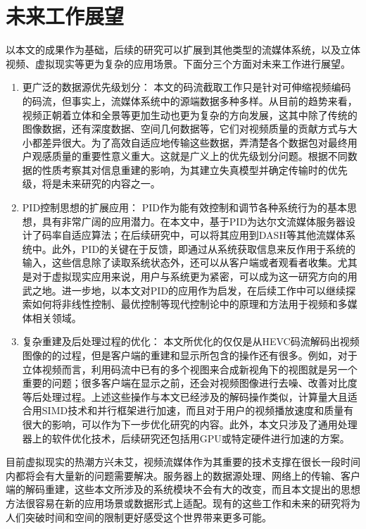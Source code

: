 \section{未来工作展望}

以本文的成果作为基础，后续的研究可以扩展到其他类型的流媒体系统，以及立体视频、虚拟现实等更为复杂的应用场景。下面分三个方面对未来工作进行展望。
\begin{enumerate}
\item {更广泛的数据源优先级划分：}
本文的码流截取工作只是针对可伸缩视频编码的码流，但事实上，流媒体系统中的源端数据多种多样。从目前的趋势来看，视频正朝着立体和全景等更加生动也更为复杂的方向发展，这其中除了传统的图像数据，还有深度数据、空间几何数据等，它们对视频质量的贡献方式与大小都差异很大。为了高效自适应地传输这些数据，弄清楚各个数据包对最终用户观感质量的重要性意义重大。这就是广义上的优先级划分问题。根据不同数据的性质考察其对信息重建的影响，为其建立失真模型并确定传输时的优先级，将是未来研究的内容之一。
\item {PID控制思想的扩展应用：}
PID作为能有效控制和调节各种系统行为的基本思想，具有非常广阔的应用潜力。在本文中，基于PID为达尔文流媒体服务器设计了码率自适应算法；在后续研究中，可以将其应用到DASH等其他流媒体系统中。此外，PID的关键在于反馈，即通过从系统获取信息来反作用于系统的输入，这些信息除了读取系统状态外，还可以从客户端或者观看者收集。尤其是对于虚拟现实应用来说，用户与系统更为紧密，可以成为这一研究方向的用武之地。进一步地，以本文对PID的应用作为启发，在后续工作中可以继续探索如何将非线性控制、最优控制等现代控制论中的原理和方法用于视频和多媒体相关领域。
\item {复杂重建及后处理过程的优化：}
本文所优化的仅仅是从HEVC码流解码出视频图像的的过程，但是客户端的重建和显示所包含的操作还有很多。例如，对于立体视频而言，利用码流中已有的多个视图来合成新视角下的视图就是另一个重要的问题；很多客户端在显示之前，还会对视频图像进行去噪、改善对比度等后处理过程。上述这些操作与本文已经涉及的解码操作类似，计算量大且适合用SIMD技术和并行框架进行加速，而且对于用户的视频播放速度和质量有很大的影响，可以作为下一步优化研究的内容。此外，本文只涉及了通用处理器上的软件优化技术，后续研究还包括用GPU或特定硬件进行加速的方案。
\end{enumerate}

目前虚拟现实的热潮方兴未艾，视频流媒体作为其重要的技术支撑在很长一段时间内都将会有大量新的问题需要解决。服务器上的数据源处理、网络上的传输、客户端的解码重建，这些本文所涉及的系统模块不会有大的改变，而且本文提出的思想方法很容易在新的应用场景或数据形式上适配。现有的这些工作和未来的研究将为人们突破时间和空间的限制更好感受这个世界带来更多可能。